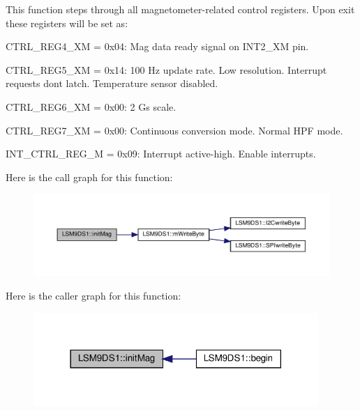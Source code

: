 This function steps through all magnetometer-\/related control registers. Upon exit these registers will be set as\+:
\begin{DoxyItemize}
\item C\+T\+R\+L\+\_\+\+R\+E\+G4\+\_\+\+XM = 0x04\+: Mag data ready signal on I\+N\+T2\+\_\+\+XM pin.
\item C\+T\+R\+L\+\_\+\+R\+E\+G5\+\_\+\+XM = 0x14\+: 100 Hz update rate. Low resolution. Interrupt requests don\textquotesingle{}t latch. Temperature sensor disabled.
\item C\+T\+R\+L\+\_\+\+R\+E\+G6\+\_\+\+XM = 0x00\+: 2 Gs scale.
\item C\+T\+R\+L\+\_\+\+R\+E\+G7\+\_\+\+XM = 0x00\+: Continuous conversion mode. Normal H\+PF mode.
\item I\+N\+T\+\_\+\+C\+T\+R\+L\+\_\+\+R\+E\+G\+\_\+M = 0x09\+: Interrupt active-\/high. Enable interrupts. 
\end{DoxyItemize}Here is the call graph for this function\+:\nopagebreak
\begin{figure}[H]
\begin{center}
\leavevmode
\includegraphics[width=350pt]{classLSM9DS1_a492aa6edcf891f273d932636e3cc470d_cgraph}
\end{center}
\end{figure}
Here is the caller graph for this function\+:\nopagebreak
\begin{figure}[H]
\begin{center}
\leavevmode
\includegraphics[width=306pt]{classLSM9DS1_a492aa6edcf891f273d932636e3cc470d_icgraph}
\end{center}
\end{figure}
\mbox{\label{classLSM9DS1_a4286d5803ab028c657e007ae99acc60a}} 
